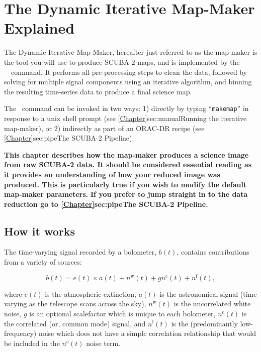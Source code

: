\chapter{The Dynamic Iterative Map-Maker Explained}
\label{sec:dimm}

The Dynamic Iterative Map-Maker, hereafter just referred to as the
map-maker is the tool you will use to produce SCUBA-2 maps, and is
implemented by the \smurf\ \makemap\ command. It performs
all pre-processing steps to clean the data, followed by solving for
multiple signal components using an iterative algorithm, and binning
the resulting time-series data to produce a final science map.

The \makemap\ command can be invoked in two ways: 1) directly by typing
``\texttt{makemap}'' in response to a unix shell prompt (see
\cref{Chapter}{sec:manual}{Running the iterative map-maker}), or 2)
indirectly as part of an ORAC-DR recipe (see
\cref{Chapter}{sec:pipe}{The SCUBA-2 Pipeline}).

\textbf{This chapter describes how the map-maker produces a science image
from raw SCUBA-2 data. It should be considered essential reading as it
provides an understanding of how your reduced image was produced. This is
particularly true if you wish to modify the default map-maker parameters.}
\color{red}\textbf{ If you prefer to jump straight in to the data reduction go
to \cref{Chapter}{sec:pipe}{The SCUBA-2 Pipeline}.}\color{black}


\section{How it works}

The time-varying signal recorded by a bolometer, $b(t)$, contains
contributions from a variety of sources:

\begin{equation}
\label{eq:bolsig}
b(t) = e(t) \times a(t) + n^{\textrm{w}}(t) + gn^{\textrm{c}}(t) + n^{\textrm{f}}(t),
\end{equation}

where $e(t)$ is the atmospheric extinction, $a(t)$ is the astronomical
signal (time varying as the telescope scans across the sky),
$n^{\textrm{w}}(t)$ is the uncorrelated white noise, $g$ is an
optional scalefactor which is unique to each bolometer,
$n^{\textrm{c}}(t)$ is the correlated (or, common mode) signal, and
$n^{\textrm{f}}(t)$ is the (predominantly low-frequency) noise which
does not have a simple correlation relationship that would be included
in the $n^{\textrm{c}}(t)$ noise term.

